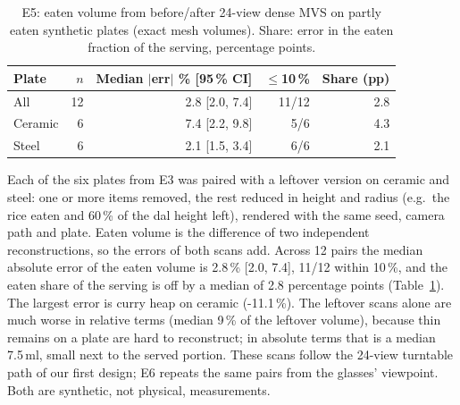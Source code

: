 \begin{table}[t]\centering\small
\caption{E5: eaten volume from before/after 24-view dense MVS on partly eaten synthetic plates (exact mesh volumes). Share: error in the eaten fraction of the serving, percentage points.}
\label{tab:e5}
\setlength{\tabcolsep}{4pt}
\begin{tabular}{lrrrr}
\toprule
Plate & $n$ & Median $|$err$|$ \% [95\,\% CI] & $\le$10\,\% & Share (pp) \\
\midrule
All & 12 & 2.8 [2.0, 7.4] & 11/12 & 2.8 \\
Ceramic & 6 & 7.4 [2.2, 9.8] & 5/6 & 4.3 \\
Steel & 6 & 2.1 [1.5, 3.4] & 6/6 & 2.1 \\
\bottomrule
\end{tabular}
\end{table}

Each of the six plates from E3 was paired with a leftover version on ceramic and steel: one or more items removed, the rest reduced in height and radius (e.g.\ the rice eaten and 60\,\% of the dal height left), rendered with the same seed, camera path and plate. Eaten volume is the difference of two independent reconstructions, so the errors of both scans add. Across 12 pairs the median absolute error of the eaten volume is 2.8\,\% [2.0, 7.4], 11/12 within 10\,\%, and the eaten share of the serving is off by a median of 2.8 percentage points (Table~\ref{tab:e5}). The largest error is curry heap on ceramic (-11.1\,\%). The leftover scans alone are much worse in relative terms (median 9\,\% of the leftover volume), because thin remains on a plate are hard to reconstruct; in absolute terms that is a median 7.5\,ml, small next to the served portion. These scans follow the 24-view turntable path of our first design; E6 repeats the same pairs from the glasses' viewpoint. Both are synthetic, not physical, measurements.
